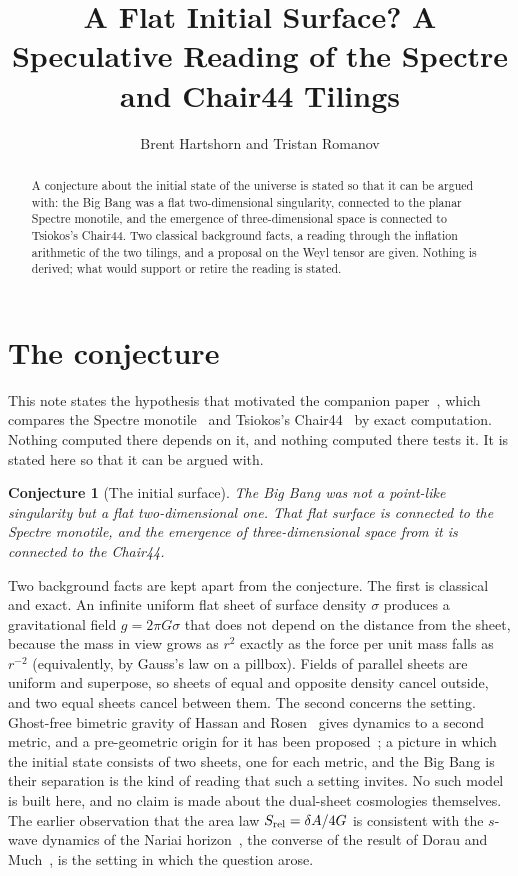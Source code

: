 \documentclass[11pt]{article}
\title{A Flat Initial Surface? A Speculative Reading of the Spectre and Chair44 Tilings}
\author{Brent Hartshorn \orcidlink{0009-0004-2853-655X}
        and Tristan Romanov}
\newtheorem{conj}{Conjecture}
\theoremstyle{definition}
\theoremstyle{remark}
\begin{document}
\maketitle


\begin{abstract}
A conjecture about the initial state of the universe is stated so that it can be argued with: the Big Bang was a flat
two-dimensional singularity, connected to the planar Spectre monotile, and the emergence of three-dimensional space is
connected to Tsiokos's Chair44.  Two classical background facts, a reading through the inflation arithmetic of the two
tilings, and a proposal on the Weyl tensor are given.  Nothing is derived; what would support or retire the reading is
stated.
\end{abstract}


\section{The conjecture}
\label{sec:thesis}

This note states the hypothesis that motivated the companion paper~\cite{HartshornRomanov}, which compares the Spectre
monotile~\cite{SmithEtAl2} and Tsiokos's Chair44~\cite{Tsiokos1} by exact computation.  Nothing computed there depends
on it, and nothing computed there tests it.  It is stated here so that it can be argued with.

\begin{conj}[The initial surface]
\label{conj:bang}
The Big Bang was not a point-like singularity but a flat two-dimensional one.  That flat surface is connected to the
Spectre monotile, and the emergence of three-dimensional space from it is connected to the Chair44.
\end{conj}

\noindent
Two background facts are kept apart from the conjecture.  The first is classical and exact.  An infinite uniform flat sheet
of surface density $\sigma$ produces a gravitational field $g=2\pi G\sigma$ that does not depend on the distance from the
sheet, because the mass in view grows as $r^{2}$ exactly as the force per unit mass falls as $r^{-2}$ (equivalently, by
Gauss's law on a pillbox).  Fields of parallel sheets are uniform and superpose, so sheets of equal and opposite density
cancel outside, and two equal sheets cancel between them.  The second concerns the setting.  Ghost-free bimetric gravity
of Hassan and Rosen~\cite{HassanRosen} gives dynamics to a second metric, and a pre-geometric origin for it has been
proposed~\cite{PreGeometric}; a picture in which the initial state consists of two sheets, one for each metric, and the Big
Bang is their separation is the kind of reading that such a setting invites.  No such model is built here, and no claim
is made about the dual-sheet cosmologies themselves.  The earlier observation that the area law
$S_{\rm rel}=\delta A/4G$ is consistent with the $s$-wave dynamics of the Nariai horizon~\cite{hartshorn2026}, the converse
of the result of Dorau and Much~\cite{DorauMuch}, is the setting in which the question arose.
\end{document}
